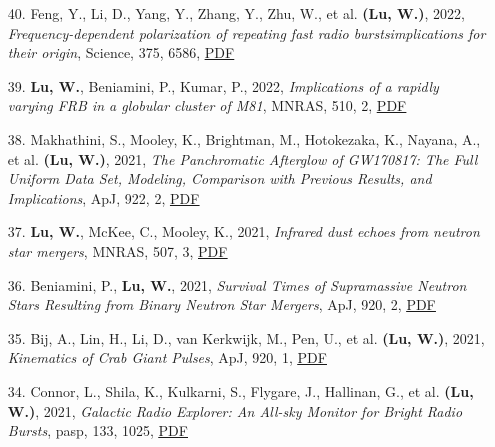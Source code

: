 \begin{itemize}[leftmargin=0.65cm]
\vspace{-0.1cm}
\item[40.]{Feng, Y., Li, D., Yang, Y., Zhang, Y., Zhu, W., et al. {\bf (Lu, W.)}, 2022, {\it Frequency-dependent polarization of repeating fast radio bursts{\textemdash}implications for their origin}, Science, 375, 6586, \href{https://ui.adsabs.harvard.edu/abs/2022Sci...375.1266F}{\underline{PDF}}}

\vspace{-0.1cm}
\item[39.]{{\bf Lu, W.}, Beniamini, P., Kumar, P., 2022, {\it Implications of a rapidly varying FRB in a globular cluster of M81}, MNRAS, 510, 2, \href{https://ui.adsabs.harvard.edu/abs/2022MNRAS.510.1867L}{\underline{PDF}}}

\vspace{-0.1cm}
\item[38.]{Makhathini, S., Mooley, K., Brightman, M., Hotokezaka, K., Nayana, A., et al. {\bf (Lu, W.)}, 2021, {\it The Panchromatic Afterglow of GW170817: The Full Uniform Data Set, Modeling, Comparison with Previous Results, and Implications}, ApJ, 922, 2, \href{https://ui.adsabs.harvard.edu/abs/2021ApJ...922..154M}{\underline{PDF}}}

\vspace{-0.1cm}
\item[37.]{{\bf Lu, W.}, McKee, C., Mooley, K., 2021, {\it Infrared dust echoes from neutron star mergers}, MNRAS, 507, 3, \href{https://ui.adsabs.harvard.edu/abs/2021MNRAS.507.3672L}{\underline{PDF}}}

\vspace{-0.1cm}
\item[36.]{Beniamini, P., {\bf Lu, W.}, 2021, {\it Survival Times of Supramassive Neutron Stars Resulting from Binary Neutron Star Mergers}, ApJ, 920, 2, \href{https://ui.adsabs.harvard.edu/abs/2021ApJ...920..109B}{\underline{PDF}}}

\vspace{-0.1cm}
\item[35.]{Bij, A., Lin, H., Li, D., van Kerkwijk, M., Pen, U., et al. {\bf (Lu, W.)}, 2021, {\it Kinematics of Crab Giant Pulses}, ApJ, 920, 1, \href{https://ui.adsabs.harvard.edu/abs/2021ApJ...920...38B}{\underline{PDF}}}

\vspace{-0.1cm}
\item[34.]{Connor, L., Shila, K., Kulkarni, S., Flygare, J., Hallinan, G., et al. {\bf (Lu, W.)}, 2021, {\it Galactic Radio Explorer: An All-sky Monitor for Bright Radio Bursts}, pasp, 133, 1025, \href{https://ui.adsabs.harvard.edu/abs/2021PASP..133g5001C}{\underline{PDF}}}


\end{itemize}
